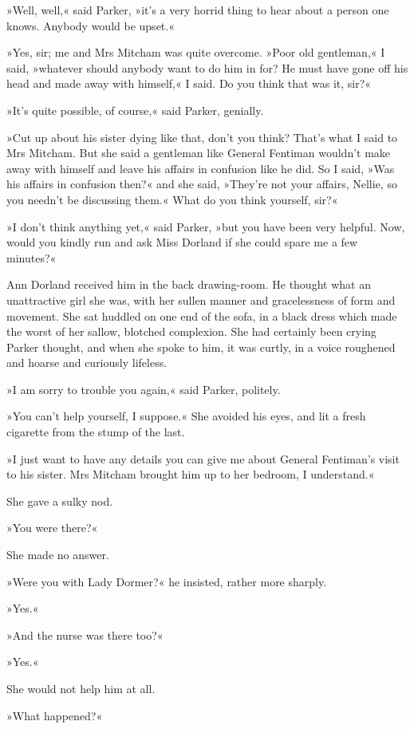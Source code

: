 »Well, well,« said Parker, »it's a very horrid thing to hear about a person one knows. Anybody would be upset.«

»Yes, sir; me and Mrs Mitcham was quite overcome. »Poor old gentleman,« I said, »whatever should anybody want to do him in for? He must have gone off his head and made away with himself,« I said. Do you think that was it, sir?«

»It's quite possible, of course,« said Parker, genially.

»Cut up about his sister dying like that, don't you think? That's what I said to Mrs Mitcham. But she said a gentleman like General Fentiman wouldn't make away with himself and leave his affairs in confusion like he did. So I said, »Was his affairs in confusion then?« and she said, »They're not your affairs, Nellie, so you needn't be discussing them.« What do you think yourself, sir?«

»I don't think anything yet,« said Parker, »but you have been very helpful. Now, would you kindly run and ask Miss Dorland if she could spare me a few minutes?«

Ann Dorland received him in the back drawing-room. He thought what an unattractive girl she was, with her sullen manner and gracelessness of form and movement. She sat huddled on one end of the sofa, in a black dress which made the worst of her sallow, blotched complexion. She had certainly been crying Parker thought, and when she spoke to him, it was curtly, in a voice roughened and hoarse and curiously lifeless.

»I am sorry to trouble you again,« said Parker, politely.

»You can't help yourself, I suppose.« She avoided his eyes, and lit a fresh cigarette from the stump of the last.

»I just want to have any details you can give me about General Fentiman's visit to his sister. Mrs Mitcham brought him up to her bedroom, I understand.«

She gave a sulky nod.

»You were there?«

She made no answer.

»Were you with Lady Dormer?« he insisted, rather more sharply.

»Yes.«

»And the nurse was there too?«

»Yes.«

She would not help him at all.

»What happened?«

